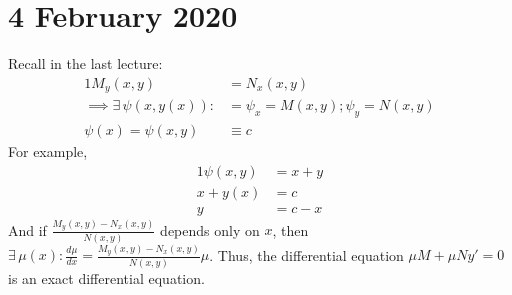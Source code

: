\documentclass[diffeq.tex]{subfiles}
\begin{document}
\chapter{4 February 2020}
    Recall in the last lecture:
    \begin{alignat}{1}
        M_{y}(x, y) &= N_{x}(x, y)\\
        \implies \exists\,\psi(x, y(x)):&= \psi_{x}=M(x,y); \psi_{y}=N(x, y)\\
        \psi(x) = \psi(x, y) &\equiv c
    \end{alignat}
    For example,
    \begin{alignat}{1}
        \psi(x, y) &= x + y\\
        x + y(x) &= c\\
        y &= c - x
    \end{alignat}
    And if $\frac{M_{y}(x, y) - N_{x}(x, y)}{N(x, y)}$ depends only on $x$, then $\exists\,\mu(x): \frac{d\mu}{dx} = \frac{M_{y}(x, y) - N_{x}(x, y)}{N(x, y)}\mu$. Thus, the differential equation $\mu M + \mu Ny' = 0$ is an exact differential equation.
\end{document}
